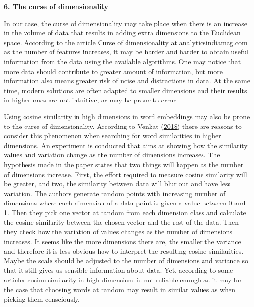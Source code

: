 \documentclass[12pt,]{book}
\begin{document}
\textbf{6. The curse of dimensionality}

In our case, the curse of dimensionality may take place when there is an
increase in the volume of data that results in adding extra dimensions
to the Euclidean space. According to the article
\href{https://analyticsindiamag.com/curse-of-dimensionality-and-what-beginners-should-do-to-overcome-it/}{Curse
of dimensionality at analyticsindiamag.com} as the number of features
increases, it may be harder and harder to obtain useful information from
the data using the available algorithms. One may notice that more data
should contribute to greater amount of information, but more information
also means greater risk of noise and distractions in data. At the same
time, modern solutions are often adapted to smaller dimensions and their
results in higher ones are not intuitive, or may be prone to error.

Using cosine similarity in high dimensions in word embeddings may also
be prone to the curse of dimensionality. According to Venkat
(\protect\hyperlink{ref-Venkat2018Curse}{2018}) there are reasons to
consider this phenomenon when searching for word similarities in higher
dimensions. An experiment is conducted that aims at showing how the
similarity values and variation change as the number of dimensions
increases. The hypothesis made in the paper states that two things will
happen as the number of dimensions increase. First, the effort required
to measure cosine similarity will be greater, and two, the similarity
between data will blur out and have less variation. The authors generate
random points with increasing number of dimensions where each dimension
of a data point is given a value between 0 and 1. Then they pick one
vector at random from each dimension class and calculate the cosine
similarity between the chosen vector and the rest of the data. Then they
check how the variation of values changes as the number of dimensions
increases. It seems like the more dimensions there are, the smaller the
variance and therefore it is less obvious how to interpret the resulting
cosine similarities. Maybe the scale should be adjusted to the number of
dimensions and variance so that it still gives us sensible information
about data. Yet, according to some articles cosine similarity in high
dimensions is not reliable enough as it may be the case that choosing
words at random may result in similar values as when picking them
consciously.
\end{document}
